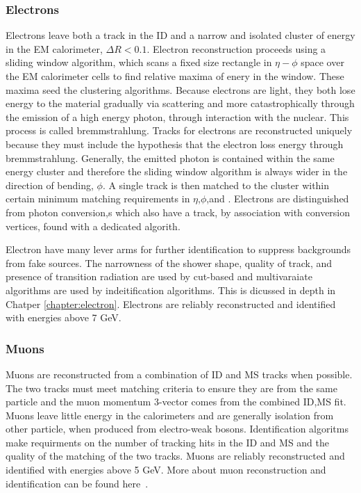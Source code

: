 \subsubsection{Electrons}

Electrons leave both a track in the ID and a narrow and isolated cluster of energy in the EM calorimeter, $\Delta R < 0.1$. Electron reconstruction proceeds using a sliding window algorithm, which scans a fixed size rectangle in $\eta-\phi$ space over the EM calorimeter cells to find relative maxima of enery in the window\cite{ATLAS-CONF-2014-032}. These maxima seed the clustering algorithms. Because electrons are light, they both lose energy to the material gradually via scattering and more catastrophically through the emission of a high energy photon, through interaction with the nuclear. This process is called bremmstrahlung. Tracks for electrons are reconstructed uniquely because they must include the hypothesis that the electron loss energy through bremmstrahlung. Generally, the emitted photon is contained within the same energy cluster and therefore the sliding window algorithm is always wider in the direction of bending, $\phi$. A single track is then matched to the cluster within certain minimum matching requirements in $\eta$,$\phi$,and \pt. Electrons are distinguished from photon conversion,s which also have a track, by association with conversion vertices, found with a dedicated algorith.

Electron have many lever arms for further identification to suppress backgrounds from fake sources. The narrowness of the shower shape, quality of track, and presence of transition radiation are used by cut-based and multivaraiate algorithms are used by indeitification algorithms. This is dicussed in depth in Chatper \ref{chapter:electron}. Electrons are reliably reconstructed and identified with energies above 7 GeV. 

\subsubsection{Muons}

Muons are reconstructed from a combination of ID and MS tracks when possible. The two tracks must meet matching criteria to ensure they are from the same particle and the muon momentum 3-vector comes from the combined ID,MS fit. Muons leave little energy in the calorimeters and are generally isolation from other particle, when produced from electro-weak bosons. Identification algoritms make requirments on the number of tracking hits in the ID and MS and the quality of the matching of the two tracks. Muons are reliably reconstructed and identified with energies above 5 GeV. More about muon reconstruction and identification can be found here~\cite{MCP2012}.



